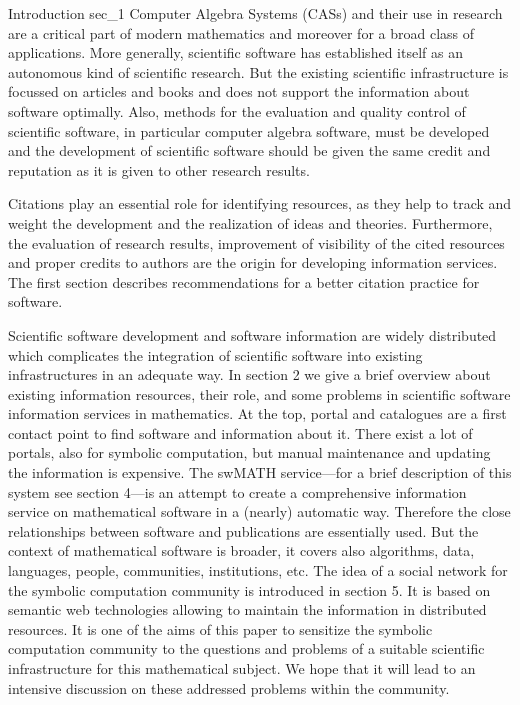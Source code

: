 \documentclass[a4paper,11pt]{article}
\begin{document}
\begin{multicols}{2}
\noindent


\Ueberschrift
{Introduction}
{sec_1}
Computer Algebra Systems (CASs) and their use in research are a critical part of modern mathematics and more\-over for a broad class of applications. More generally, scientific software has established itself as an autonomous kind of scientific research. But the existing scientific infrastructure is focussed on articles and books and does not support the information about software optimally. Also, methods for the evaluation and quality control of scientific software, in particular computer algebra software, must be developed and the development of scientific software should be given the same credit and reputation as it is given to other research results.

Citations play an essential role for identifying resources, as they help to track and weight the development and the realization of ideas and theories. Furthermore, the evaluation of research results, improvement of visibility of the cited resources and proper credits to authors are the origin for developing information services. The first section describes recommendations for a better citation practice for software.

Scientific software development and software information are widely distributed which complicates the integration of scientific software into existing infrastructures in an adequate way. In section 2 we give a brief overview about existing information resources, their \mbox{role}, and some problems in scientific software information services in mathematics. At the top, portal and catalogues are a first contact point to find software and information about it. There exist a lot of portals, also for symbolic computation, but manual maintenance and updating the information is expensive.  The swMATH service---for a brief description of this system see section 4---is an attempt to create a comprehensive information service  on mathematical software in a (nearly) automatic way. Therefore the close relationships between software and publications are essentially used.  But the context of mathematical software is broader, it covers also algorithms, data, languages, people, communities, institutions, etc.  The idea of a social network for the symbolic computation community is introduced in section 5. It is based on semantic web technologies allowing to maintain the information in distributed resources. It is one of the aims of this paper to sensitize the symbolic computation community to the questions and problems of a suitable scientific infrastructure for this mathematical subject. We hope that it will lead to an intensive discussion on these addressed problems within the community.


\end{multicols}
\end{document}
